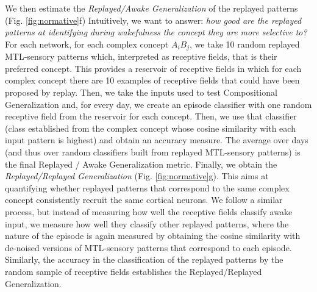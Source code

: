 \documentclass{article}
\begin{document}
We then estimate the \textit{Replayed/Awake Generalization} of the replayed patterns (Fig. \ref{fig:normative}f) Intuitively, we want to answer: \textit{how good are the replayed patterns at identifying during wakefulness the concept they are more selective to?} For each network, for each complex concept $A_iB_j$, we take 10 random replayed MTL-sensory patterns which, interpreted as receptive fields, that is their preferred concept. This provides a reservoir of receptive fields in which for each complex concept there are 10 examples of receptive fields that could have been proposed by replay. Then, we take the inputs used to test Compositional Generalization and, for every day, we create an episode classifier with one random receptive field from the reservoir for each concept. Then, we use that classifier (class established from the complex concept whose cosine similarity with each input pattern is highest) and obtain an accuracy measure. The average over days (and thus over random classifiers built from replayed MTL-sensory patterns) is the final Replayed / Awake Generalization metric.
\newline\newline
Finally, we obtain the \textit{Replayed/Replayed Generalization} (Fig. \ref{fig:normative}g). This aims at quantifying whether replayed patterns that correspond to the same complex concept consistently recruit the same cortical neurons. We follow a similar process, but instead of measuring how well the receptive fields classify awake input, we measure how well they classify other replayed patterns, where the nature of the episode is again measured by obtaining the cosine similarity with de-noised versions of MTL-sensory patterns that correspond to each episode. Similarly, the accuracy in the classification of the replayed patterns by the random sample of receptive fields establishes the Replayed/Replayed Generalization.
\end{document}

